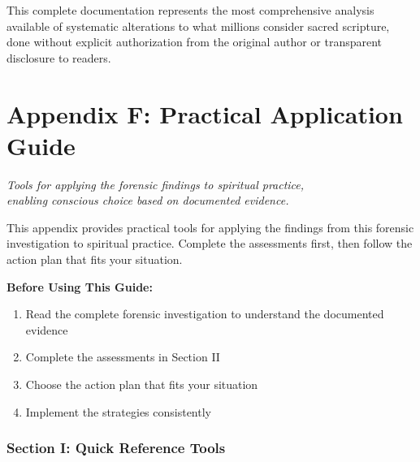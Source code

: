 \documentclass[11pt,twoside]{book}
\begin{document}
This complete documentation represents the most comprehensive analysis available of systematic alterations to what millions consider sacred scripture, done without explicit authorization from the original author or transparent disclosure to readers.
\part*{Appendix F: Practical Application Guide}
\label{sec:orgd40e3c0}
\thispagestyle{plain}

{\centering\itshape Tools for applying the forensic findings to spiritual practice,\\enabling conscious choice based on documented evidence.\par}
\vspace{0.3cm}

\normalfont\justifying
This appendix provides practical tools for applying the findings from this forensic investigation to spiritual practice. Complete the assessments first, then follow the action plan that fits your situation.

\textbf{\textbf{Before Using This Guide:}}
\begin{enumerate}
\item Read the complete forensic investigation to understand the documented evidence
\item Complete the assessments in Section II
\item Choose the action plan that fits your situation
\item Implement the strategies consistently
\end{enumerate}
\section*{Section I: Quick Reference Tools}
\label{sec:orgb645901}
\end{document}
